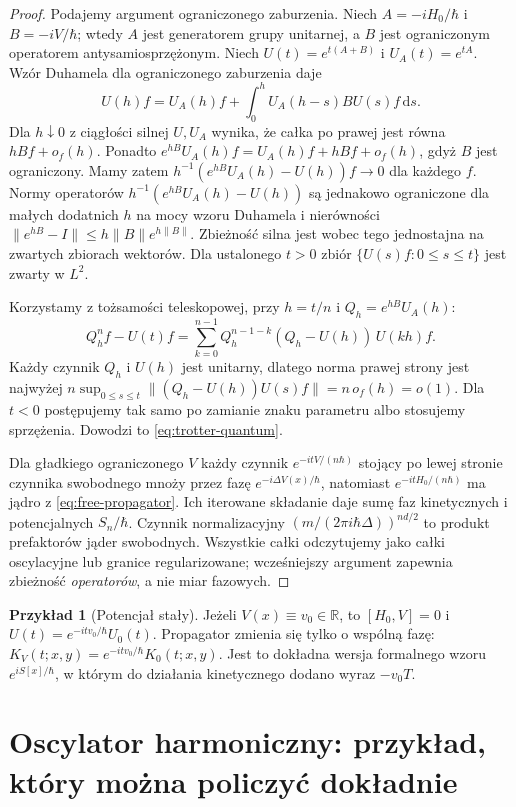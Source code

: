 \documentclass[11pt,a4paper,oneside]{report}
\numberwithin{equation}{chapter}
\theoremstyle{plain}
\theoremstyle{definition}
\newtheorem{przyklad}{Przykład}[chapter]
\theoremstyle{remark}
\newcommand{\R}{\mathbb{R}}
\newcommand{\dd}{\mathrm{d}}
\begin{document}
\begin{proof}
Podajemy argument ograniczonego zaburzenia.
Niech $A=-iH_0/\hbar$ i $B=-iV/\hbar$; wtedy $A$
jest generatorem grupy unitarnej, a $B$ jest
ograniczonym operatorem antysamiosprzężonym.
Niech $U(t)=e^{t(A+B)}$ i $U_A(t)=e^{tA}$.
Wzór Duhamela dla ograniczonego zaburzenia daje
\[
 U(h)f=U_A(h)f+\int_0^h U_A(h-s)BU(s)f\,\dd s.
\]
Dla $h\downarrow0$ z ciągłości silnej $U,U_A$
wynika, że całka po prawej jest równa
$hBf+o_f(h)$. Ponadto
$e^{hB}U_A(h)f=U_A(h)f+hBf+o_f(h)$,
gdyż $B$ jest ograniczony. Mamy zatem
$h^{-1}(e^{hB}U_A(h)-U(h))f\to0$ dla każdego $f$.
Normy operatorów
$h^{-1}(e^{hB}U_A(h)-U(h))$ są jednakowo
ograniczone dla małych dodatnich $h$ na mocy
wzoru Duhamela i nierówności
$\|e^{hB}-I\|\le h\|B\|e^{h\|B\|}$.
Zbieżność silna jest wobec tego jednostajna na
zwartych zbiorach wektorów. Dla ustalonego $t>0$
zbiór $\{U(s)f:0\le s\le t\}$ jest zwarty w $L^2$.

Korzystamy z tożsamości teleskopowej, przy
$h=t/n$ i $Q_h=e^{hB}U_A(h)$:
\[
 Q_h^n f-U(t)f
 =\sum_{k=0}^{n-1} Q_h^{n-1-k}
   (Q_h-U(h))\,U(kh)f.
\]
Każdy czynnik $Q_h$ i $U(h)$ jest unitarny, dlatego
norma prawej strony jest najwyżej
$n\sup_{0\le s\le t}\|(Q_h-U(h))U(s)f\|=n\,o_f(h)=o(1)$.
Dla $t<0$ postępujemy tak samo po zamianie znaku
parametru albo stosujemy sprzężenia. Dowodzi to
\eqref{eq:trotter-quantum}.

Dla gładkiego ograniczonego $V$ każdy czynnik
$e^{-itV/(n\hbar)}$ stojący po lewej stronie czynnika
swobodnego mnoży przez fazę
$e^{-i\Delta V(x)/\hbar}$, natomiast
$e^{-itH_0/(n\hbar)}$ ma jądro z
\eqref{eq:free-propagator}. Ich iterowane składanie daje
sumę faz kinetycznych i potencjalnych
$S_n/\hbar$. Czynnik normalizacyjny
$(m/(2\pi i\hbar\Delta))^{nd/2}$ to produkt
prefaktorów jąder swobodnych. Wszystkie całki
odczytujemy jako całki oscylacyjne lub granice
regularizowane; wcześniejszy argument zapewnia
zbieżność \emph{operatorów}, a nie miar fazowych.
\end{proof}

\begin{przyklad}[Potencjał stały]
Jeżeli $V(x)\equiv v_0\in\R$, to
$[H_0,V]=0$ i $U(t)=e^{-itv_0/\hbar}U_0(t)$.
Propagator zmienia się tylko o wspólną fazę:
$K_V(t;x,y)=e^{-itv_0/\hbar}K_0(t;x,y)$.
Jest to dokładna wersja formalnego wzoru
$e^{iS[x]/\hbar}$, w którym do działania
kinetycznego dodano wyraz $-v_0T$.
\end{przyklad}

\section{Oscylator harmoniczny: przykład, który można policzyć dokładnie}
\end{document}

